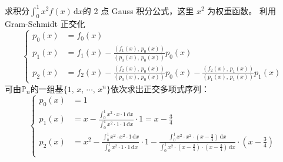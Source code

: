 \documentclass[11pt]{article}
\begin{document}
\begin{question}
    \questiontext
    {
        求积分$\displaystyle \int_{0}^{1}\!x^2f(x)\,\text{d}x$的 2 点 Gauss 积分公式，这里 $x^2$ 为权重函数。
    }
    \answer
    {
        利用 Gram-Schmidt 正交化
        \begin{equation*}
            \left\{
            \begin{aligned}
                p_0(x) & = f_0(x)                                                                                                                                                         \\
                p_1(x) & = f_1(x) - \frac{\left(f_1(x),\, p_0(x)\right)}{\left(p_0(x),\, p_0(x)\right)}p_0(x)                                                                             \\
                p_2(x) & = f_2(x) - \frac{\left(f_2(x),\, p_0(x)\right)}{\left(p_0(x),\, p_0(x)\right)}p_0(x) - \frac{\left(f_2(x),\, p_1(x)\right)}{\left(p_1(x),\, p_1(x)\right)}p_1(x)
            \end{aligned}
            \right.
        \end{equation*}
        可由$\mathbb{P}_n$的一组基$\{1,\, x,\, \cdots,\, x^n\}$依次求出正交多项式序列：
        \begin{equation*}
            \left\{
            \begin{aligned}
                p_0(x) & = 1                                                                                                                                                                                                                                                                                                                                                                                                       \\
                p_1(x) & = x - \frac{\displaystyle \int_{0}^{1}\!x^2 \cdot x \cdot 1 \,\text{d}x}{\displaystyle \int_{0}^{1}\!x^2 \cdot 1 \cdot 1 \,\text{d}x} \cdot 1 = x - \frac{3}{4}                                                                                                                                                                                                                                           \\
                p_2(x) & = x^2 - \frac{\displaystyle \int_{0}^{1}\!x^2 \cdot x^2 \cdot 1 \,\text{d}x}{\displaystyle \int_{0}^{1}\!x^2 \cdot 1 \cdot 1 \,\text{d}x} \cdot 1 - \frac{\displaystyle \int_{0}^{1}\!x^2 \cdot x^2 \cdot \left(x - \frac{3}{4}\right) \,\text{d}x}{\displaystyle \int_{0}^{1}\!x^2 \cdot \left(x - \frac{3}{4}\right) \cdot \left(x - \frac{3}{4}\right) \,\text{d}x} \cdot \left(x - \frac{3}{4}\right) \\

\end{aligned}
\end{equation*}}
\end{question}
\end{document}
